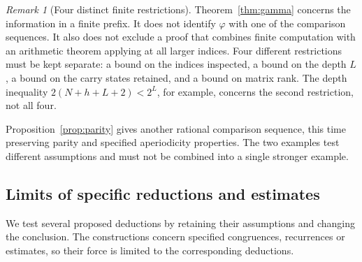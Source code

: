 \documentclass[11pt]{article}
\theoremstyle{plain}
\theoremstyle{definition}
\theoremstyle{remark}
\newtheorem{rem}[thm]{Remark}
\begin{document}
\begin{rem}[Four distinct finite restrictions]
\label{rem:b1-scope}
Theorem~\ref{thm:gamma} concerns the information in a finite prefix.
It does not identify $\varphi$ with one of the comparison sequences. It also
does not exclude a proof that combines finite computation with an arithmetic
theorem applying at all larger indices. Four different restrictions must
be kept separate: a bound on the indices inspected, a bound on the depth
$L$, a bound on the carry states retained, and a bound on matrix rank.
The depth inequality $2(N+h+L+2)<2^L$, for example, concerns the second
restriction, not all four.
\end{rem}

Proposition~\ref{prop:parity} gives another rational comparison sequence,
this time preserving parity and specified aperiodicity properties. The two
examples test different assumptions and must not be combined into a single
stronger example.


\subsection{Limits of specific reductions and estimates}

We test several proposed deductions by retaining their assumptions
and changing the conclusion. The constructions concern specified
congruences, recurrences or estimates, so their force is limited to
the corresponding deductions.
\end{document}
